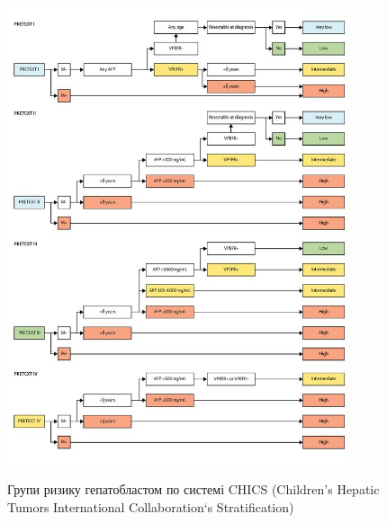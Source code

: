 \begin{figure}[h]
\centering
\includegraphics[width=0.9\textwidth]{Illustrations/risk.jpg}
\label{fig:risk} %
\caption{Групи ризику гепатобластом по системі CHICS (Children’s Hepatic Tumors International Collaboration`s Stratification)\cite{pmid24757164}}
\end{figure}
